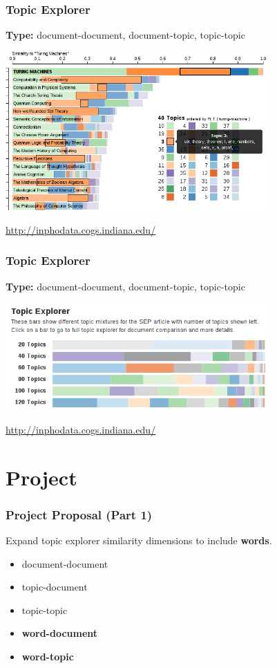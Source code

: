 \documentclass[t]{beamer}
\begin{document}
\begin{frame}
\frametitle{Topic Explorer}
\textbf{Type:} document-document, document-topic, topic-topic

\includegraphics[width=0.75\textwidth]{img/topex40.png}

\url{http://inphodata.cogs.indiana.edu/}

\cite{aaai2015}
\end{frame}

\begin{frame}
\frametitle{Topic Explorer}
\textbf{Type:} document-document, document-topic, topic-topic

\includegraphics[width=0.75\textwidth]{img/topex-comparison.png}

\url{http://inphodata.cogs.indiana.edu/}

\cite{aaai2015}
\end{frame}

\section{Project}
\begin{frame}
\frametitle{Project Proposal (Part 1)}
Expand topic explorer similarity dimensions to include \textbf{words}.
\begin{itemize}
\item document-document
\item topic-document
\item topic-topic
\item \textbf{word-document}
\item \textbf{word-topic}
\end{itemize}
\end{frame}
\end{document}
